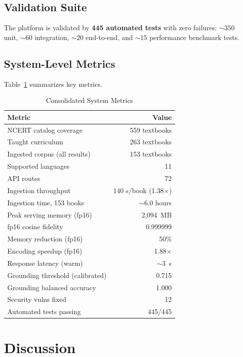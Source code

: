 \documentclass[conference]{IEEEtran}
\begin{document}
\subsection{Validation Suite}
The platform is validated by \textbf{445 automated tests} with zero failures: ${\sim}350$ unit, ${\sim}60$ integration, ${\sim}20$ end-to-end, and ${\sim}15$ performance benchmark tests.

\subsection{System-Level Metrics}
Table~\ref{tab:results} summarizes key metrics.

\begin{table}[htbp]
\caption{Consolidated System Metrics}
\label{tab:results}
\centering
\begin{tabular}{@{}lr@{}}
\toprule
\textbf{Metric} & \textbf{Value} \\
\midrule
NCERT catalog coverage & 559 textbooks \\
Taught curriculum & 263 textbooks \\
Ingested corpus (all results) & 153 textbooks \\
Supported languages & 11 \\
API routes & 72 \\
Ingestion throughput & 140 s/book (1.38$\times$) \\
Ingestion time, 153 books & ${\sim}6.0$ hours \\
Peak serving memory (fp16) & 2,094~MB \\
fp16 cosine fidelity & 0.999999 \\
Memory reduction (fp16) & 50\% \\
Encoding speedup (fp16) & 1.88$\times$ \\
Response latency (warm) & ${\sim}3$~s \\
Grounding threshold (calibrated) & 0.715 \\
Grounding balanced accuracy & 1.000 \\
Security vulns fixed & 12 \\
Automated tests passing & 445/445 \\
\bottomrule
\end{tabular}
\end{table}

\section{Discussion}
\end{document}

